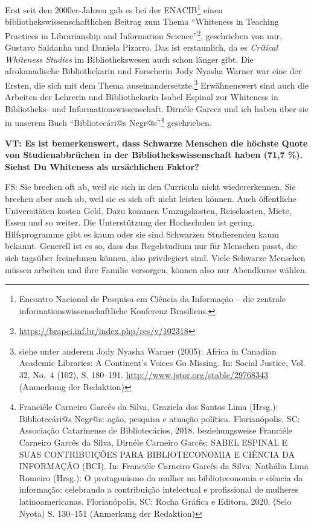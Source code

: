 \documentclass[a4paper,
fontsize=11pt,
oneside,
numbers=noperiodatend,
parskip=half-,
bibliography=totoc,
final
]{scrartcl}
\begin{document}
Erst seit den 2000er-Jahren gab es bei der ENACIB\footnote{Encontro
  Nacional de Pesquisa em Ciência da Informação -- die zentrale
  informationswissenschaftliche Konferenz Brasiliens.} einen
bibliothekswissenschaftlichen Beitrag zum Thema \enquote{Whiteness in
Teaching Practices in Librarianship and Information Science}\footnote{\url{https://brapci.inf.br/index.php/res/v/102318}},
geschrieben von mir, Gustavo Saldanha und Daniela Pizarro. Das ist
erstaunlich, da es \emph{Critical Whiteness Studies} im Bibliothekswesen
auch schon länger gibt. Die afrokanadische Bibliothekarin und Forscherin
Jody Nyasha Warner war eine der Ersten, die sich mit dem Thema
auseinandersetzte.\footnote{siehe unter anderem Jody Nyasha Warner
  (2005): Africa in Canadian Academic Libraries: A Continent's Voices Go
  Missing. In: Social Justice, Vol. 32, No.~4 (102), S. 180--191.
  \url{http://www.jstor.org/stable/29768343} (Anmerkung der Redaktion)}
Erwähnenswert sind auch die Arbeiten der Lehrerin und Bibliothekarin
Isabel Espinal zur Whiteness in Bibliotheks- und
Informationswissenschaft. Dirnéle Garcez und ich haben über sie in
unserem Buch \enquote{Bibliotecári@s Negr@s}\footnote{Franciéle Carneiro
  Garcês da Silva, Graziela dos Santos Lima (Hrsg.): Bibliotecári@s
  Negr@s: ação, pesquisa e atuação política. Florianópolis, SC:
  Associação Catarinense de Bibliotecários, 2018. beziehungsweise
  Franciéle Carneiro Garcês da Silva, Dirnéle Carneiro Garcês: SABEL
  ESPINAL E SUAS CONTRIBUIÇÕES PARA BIBLIOTECONOMIA E CIÊNCIA DA
  INFORMAÇÃO (BCI). In: Franciéle Carneiro Garcês da Silva; Nathália
  Lima Romeiro (Hrsg.): O protagonismo da mulher na biblioteconomia e
  ciência da informação: celebrando a contribuição intelectual e
  profissional de mulheres latinoamericanas. Florianópolis, SC: Rocha
  Gráfica e Editora, 2020. (Selo Nyota) S. 130--151 (Anmerkung der
  Redaktion)} geschrieben.

\textbf{VT: Es ist bemerkenswert, dass Schwarze Menschen die höchste
Quote von Studienabbrüchen in der Bibliothekswissenschaft haben (71,7
\%). Siehst Du Whiteness als ursächlichen Faktor?}

FS: Sie brechen oft ab, weil sie sich in den Curricula nicht
wiedererkennen. Sie brechen aber auch ab, weil sie es sich oft nicht
leisten können. Auch öffentliche Universitäten kosten Geld. Dazu kommen
Umzugskosten, Reisekosten, Miete, Essen und so weiter. Die Unterstützung
der Hochschulen ist gering. Hilfsprogramme gibt es kaum oder sie sind
Schwarzen Studierenden kaum bekannt. Generell ist es so, dass das
Regelstudium nur für Menschen passt, die sich tagsüber freinehmen
können, also privilegiert sind. Viele Schwarze Menschen müssen arbeiten
und ihre Familie versorgen, können also nur Abendkurse wählen.
\end{document}
